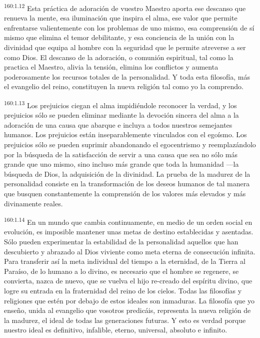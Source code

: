 \par
\textsuperscript{160:1.12} Esta práctica de adoración de vuestro Maestro aporta ese descanso que renueva la mente, esa iluminación que inspira el alma, ese valor que permite enfrentarse valientemente con los problemas de uno mismo, esa comprensión de sí mismo que elimina el temor debilitante, y esa conciencia de la unión con la divinidad que equipa al hombre con la seguridad que le permite atreverse a ser como Dios. El descanso de la adoración, o comunión espiritual, tal como la practica el Maestro, alivia la tensión, elimina los conflictos y aumenta poderosamente los recursos totales de la personalidad. Y toda esta filosofía, más el evangelio del reino, constituyen la nueva religión tal como yo la comprendo.

\par
\textsuperscript{160:1.13} Los prejuicios ciegan el alma impidiéndole reconocer la verdad, y los prejuicios sólo se pueden eliminar mediante la devoción sincera del alma a la adoración de una causa que abarque e incluya a todos nuestros semejantes humanos. Los prejuicios están inseparablemente vinculados con el egoísmo. Los prejuicios sólo se pueden suprimir abandonando el egocentrismo y reemplazándolo por la búsqueda de la satisfacción de servir a una causa que sea no sólo más grande que uno mismo, sino incluso más grande que toda la humanidad ---la búsqueda de Dios, la adquisición de la divinidad. La prueba de la madurez de la personalidad consiste en la transformación de los deseos humanos de tal manera que busquen constantemente la comprensión de los valores más elevados y más divinamente reales.

\par
\textsuperscript{160:1.14} En un mundo que cambia continuamente, en medio de un orden social en evolución, es imposible mantener unas metas de destino establecidas y asentadas. Sólo pueden experimentar la estabilidad de la personalidad aquellos que han descubierto y abrazado al Dios viviente como meta eterna de consecución infinita. Para transferir así la meta individual del tiempo a la eternidad, de la Tierra al Paraíso, de lo humano a lo divino, es necesario que el hombre se regenere, se convierta, nazca de nuevo, que se vuelva el hijo re-creado del espíritu divino, que logre su entrada en la fraternidad del reino de los cielos. Todas las filosofías y religiones que estén por debajo de estos ideales son inmaduras. La filosofía que yo enseño, unida al evangelio que vosotros predicáis, representa la nueva religión de la madurez, el ideal de todas las generaciones futuras. Y esto es verdad porque nuestro ideal es definitivo, infalible, eterno, universal, absoluto e infinito.

